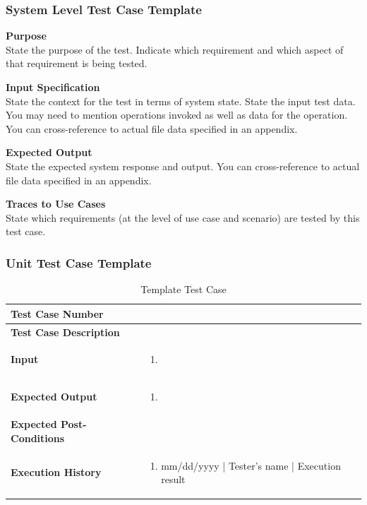 \documentclass[12pt]{article}
\begin{document}
\subsubsection{System Level Test Case Template}
\noindent
{\bf Purpose}\\
State the purpose of the test.
Indicate which requirement and which aspect of that requirement is being tested.

\noindent
{\bf Input Specification}\\
State the context for the test in terms of system state.
State the input test data. You may need to mention operations invoked as well as data for the operation.
You can cross-reference to actual file data specified in an appendix.

\noindent
{\bf Expected Output}\\
State the expected system response and output.
You can cross-reference to actual file data specified in an appendix.

\noindent
{\bf Traces to Use Cases}\\
State which requirements (at the level of use case and scenario) are tested by this test case.

\subsubsection{Unit Test Case Template}
\def\arraystretch{1.5}%
\begin{table}[htbp]
\centering
\caption{Template Test Case}
\label{UT-X}
\begin{tabularx}{\textwidth}{ | l | X |}
\hline
\textbf{Test Case Number}      &                           \\ \hline
\textbf{Test Case Description}    &                  \\ \hline
\textbf{Input}         & 	\begin{enumerate}
	\item
\end{enumerate} \\ \hline

\textbf{Expected Output}     & \begin{enumerate}
	\item 
\end{enumerate} \\ \hline
\textbf{Expected Post-Conditions}           &                 \\ \hline
\textbf{Execution History}   &  \begin{enumerate}
	\item mm/dd/yyyy | Tester's name | Execution result
\end {enumerate} \\ \hline
\end{tabularx}
\end{table}
\clearpage
\end{document}
